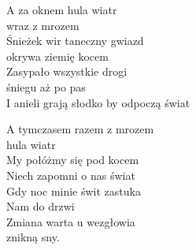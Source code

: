 \begin{text}
    A za oknem hula wiatr\\
    wraz z mrozem\\
    Śnieżek wir taneczny gwiazd\\
    okrywa ziemię kocem\\
    Zasypało wszystkie drogi\\
    śniegu aż po pas\\
    I anieli grają słodko by odpoczą świat

    A tymczasem razem z mrozem\\
    hula wiatr\\
    My połóżmy się pod kocem\\
    Niech zapomni o nas świat\\
    Gdy noc minie świt zastuka\\
    Nam do drzwi\\
    Zmiana warta u wezgłowia\\
    znikną sny.
\end{text}
\begin{chord}

\end{chord}